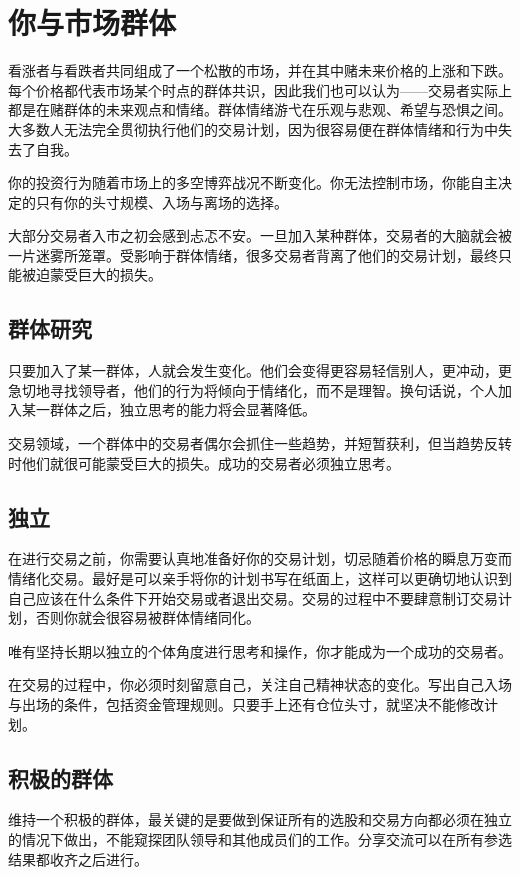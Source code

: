 \section{你与市场群体}
看涨者与看跌者共同组成了一个松散的市场，并在其中赌未来价格的上涨和下跌。每个价格都代表市场某个时点的群体共识，因此我们也可以认为——交易者实际上都是在赌群体的未来观点和情绪。群体情绪游弋在乐观与悲观、希望与恐惧之间。大多数人无法完全贯彻执行他们的交易计划，因为很容易便在群体情绪和行为中失去了自我。

你的投资行为随着市场上的多空博弈战况不断变化。你无法控制市场，你能自主决定的只有你的头寸规模、入场与离场的选择。

大部分交易者入市之初会感到忐忑不安。一旦加入某种群体，交易者的大脑就会被一片迷雾所笼罩。受影响于群体情绪，很多交易者背离了他们的交易计划，最终只能被迫蒙受巨大的损失。

\subsection*{群体研究}
只要加入了某一群体，人就会发生变化。他们会变得更容易轻信别人，更冲动，更急切地寻找领导者，他们的行为将倾向于情绪化，而不是理智。换句话说，个人加入某一群体之后，独立思考的能力将会显著降低。

交易领域，一个群体中的交易者偶尔会抓住一些趋势，并短暂获利，但当趋势反转时他们就很可能蒙受巨大的损失。成功的交易者必须独立思考。
\subsection*{独立}
在进行交易之前，你需要认真地准备好你的交易计划，切忌随着价格的瞬息万变而情绪化交易。最好是可以亲手将你的计划书写在纸面上，这样可以更确切地认识到自己应该在什么条件下开始交易或者退出交易。交易的过程中不要肆意制订交易计划，否则你就会很容易被群体情绪同化。

唯有坚持长期以独立的个体角度进行思考和操作，你才能成为一个成功的交易者。
\begin{tcolorbox}
    在交易的过程中，你必须时刻留意自己，关注自己精神状态的变化。写出自己入场与出场的条件，包括资金管理规则。只要手上还有仓位头寸，就坚决不能修改计划。
\end{tcolorbox}
\subsection*{积极的群体}
维持一个积极的群体，最关键的是要做到保证所有的选股和交易方向都必须在独立的情况下做出，不能窥探团队领导和其他成员们的工作。分享交流可以在所有参选结果都收齐之后进行。
